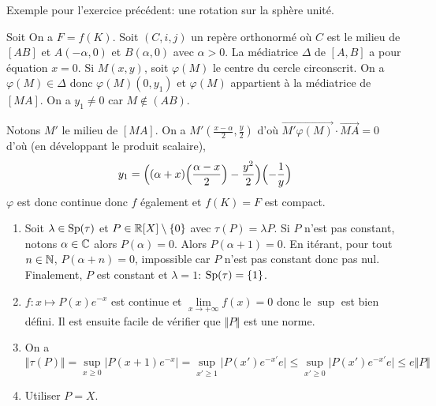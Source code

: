 \begin{remark}
	Exemple pour l'exercice précédent: une rotation sur la sphère unité.
\end{remark}

\begin{solution}
	Soit 
	On a $F=f(K)$. Soit $(C,i,j)$ un repère orthonormé où $C$ est le milieu de $[AB]$ et $A(-\alpha,0)$ et $B(\alpha,0)$ avec $\alpha>0$. La médiatrice $\Delta$ de $[A,B]$ a pour équation $x=0$. Si $M(x,y)$, soit $\varphi(M)$ le centre du cercle circonscrit. On a $\varphi(M)\in\Delta$ donc $\varphi(M)(0,y_{1})$ et $\varphi(M)$ appartient à la médiatrice de $[MA]$. On a $y_{1}\neq0$ car $M\notin(AB)$.

	Notons $M'$ le milieu de $[MA]$. On a $M'(\frac{x-\alpha}{2},\frac{y}{2})$ d'où $\vec{M'\varphi(M)}\cdot\vec{MA}=0$ d'où (en développant le produit scalaire),
	$$y_{1}=\Bigl((\alpha+x)\Bigl(\frac{\alpha-x}{2}\Bigr)-\frac{y^{2}}{2}\Bigr)\Bigl(-\frac{1}{y}\Bigr)$$
	$\varphi$ est donc continue donc $f$ également et $f(K)=F$ est compact.
\end{solution}

\begin{solution}
	\phantom{}
	\begin{enumerate}
		\item Soit $\lambda\in\operatorname{Sp}(\tau)$ et $P\in\mathbb{R}[X]\setminus\{0\}$ avec $\tau(P)=\lambda P$. Si $P$ n'est pas constant, notons $\alpha\in\mathbb{C}$ alors $P(\alpha)=0$. Alors $P(\alpha+1)=0$. En itérant, pour tout $n\in\mathbb{N}$, $P(\alpha+n)=0$, impossible car $P$ n'est pas constant donc pas nul. Finalement, $P$ est constant et $\lambda=1$: $\operatorname{Sp}(\tau)=\{1\}$.
		\item $f\colon x\mapsto P(x)e^{-x}$ est continue et $\lim\limits_{x\to+\infty}f(x)=0$ donc le $\sup$ est bien défini. Il est ensuite facile de vérifier que $\Vert P\Vert$ est une norme.
		\item On a 
		$$\Vert\tau(P)\Vert=\sup\limits_{x\geqslant0}\vert P(x+1)e^{-x}\vert=\sup\limits_{x'\geqslant1}\vert P(x')e^{-x'}e\vert\leqslant\sup\limits_{x'\geqslant0}\vert P(x')e^{-x'}e\vert\leqslant e\Vert P\Vert$$
		\item Utiliser $P=X$.
	\end{enumerate}
\end{solution}

